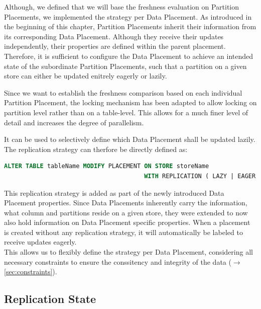 Although, we defined that we will base the freshness evaluation on Partition Placements, we implemented the strategy per Data Placement. 
As introduced in the beginning of this chapter, Partition Placements inherit their information from its corresponding Data Placement.
Although they receive their updates independently, their properties are defined within the parent placement. 
Therefore, it is sufficient to configure the Data Placement to achieve an intended state of the subordinate Partition Placements,
such that a partition on a given store can either be updated enitrely eagerly or lazily. 


Since we want to establish the freshness comparison based on each individual Partition Placement, the locking mechanism
has been adapted to allow locking on partition level rather than on a table-level. 
This allows for a much finer level of detail and increases the degree of parallelism. 

It can be used to selectively define which Data Placement shall be updated lazily.
The replication strategy can therfore be directly defined as:
\begin{lstlisting}[language=sql, caption={SQL Statement Syntax to Modify the Designated Replication Strategy for a Data Placement.},label={lst:strategy}]
ALTER TABLE tableName MODIFY PLACEMENT ON STORE storeName 
                                       WITH REPLICATION ( LAZY | EAGER );
\end{lstlisting}

This replication strategy is added as part of the newly introduced Data Placement properties. Since Data Placements inherently carry the information, what column and partitions reside
on a given store, they were extended to now also hold information on Data Placement specific properties.
When a placement is created without any replication strategy, it will automatically be labeled to receive updates eagerly.\\
This allows us to flexibly define the strategy per Data Placement, considering all necessary constraints to ensure the conssitency and integrity of the data ($\rightarrow$ \ref{sec:constraints}).




\subsection{Replication State}
\label{sec:states}


